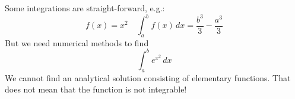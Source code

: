Some integrations are straight-forward, e.g.:
\[
    f(x) = x^2 \quad \int_a^b f(x)\,dx = \frac{b^3}{3} - \frac{a^3}{3}
\]
But we need numerical methods to find
\[ \int_a^b e^{x^2} \,dx \]
We cannot find an analytical solution consisting of elementary functions. That does not mean
that the function is not integrable!
